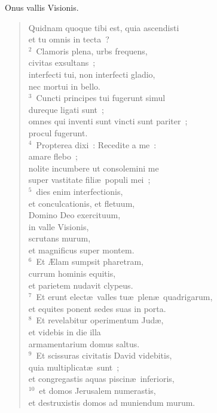\lettrine[lines=3,image=true,loversize=0.05,lraise=-0.03]{O}{}nus vallis Visionis. \begin{flushleft}\begin{verse}\vspace{6pt}Quidnam quoque tibi est, quia ascendisti\\ et tu omnis in tecta~?\\
${}^{2}$~Clamoris plena, urbs frequens,\\ civitas exsultans~;\\ interfecti tui, non interfecti gladio,\\ nec mortui in bello.\\
${}^{3}$~Cuncti principes tui fugerunt simul\\ dureque ligati sunt~;\\ omnes qui inventi sunt vincti sunt pariter~;\\ procul fugerunt.\\
${}^{4}$~Propterea dixi~: Recedite a me~:\\ amare flebo~;\\ nolite incumbere ut consolemini me\\ super vastitate fili\ae\ populi mei~;\\
${}^{5}$~dies enim interfectionis,\\ et conculcationis, et fletuum,\\ Domino Deo exercituum,\\ in valle Visionis,\\ scrutans murum,\\ et magnificus super montem.\\
${}^{6}$~Et \AE lam sumpsit pharetram,\\ currum hominis equitis,\\ et parietem nudavit clypeus.\\
${}^{7}$~Et erunt elect\ae\ valles tu\ae\ plen\ae\ quadrigarum,\\ et equites ponent sedes suas in porta.\\
${}^{8}$~Et revelabitur operimentum Jud\ae ,\\ et videbis in die illa\\ armamentarium domus saltus.\\
${}^{9}$~Et scissuras civitatis David videbitis,\\ quia multiplicat\ae\ sunt~;\\ et congregastis aquas piscin\ae\ inferioris,\\
${}^{10}$~et domos Jerusalem numerastis,\\ et destruxistis domos ad muniendum murum.\\

\end{verse}
\end{flushleft}
